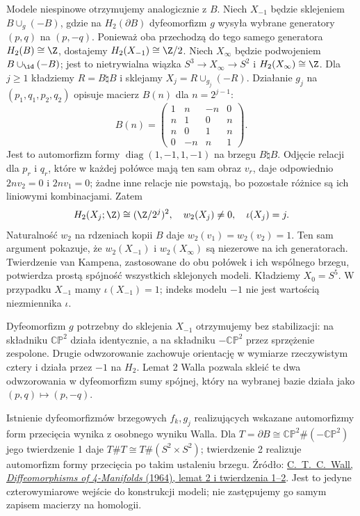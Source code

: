 Modele niespinowe otrzymujemy
analogicznie z $B$.
Niech $X_{-1}$ będzie sklejeniem
$B\cup_g(-B)$, gdzie na
$H_2(\partial B)$ dyfeomorfizm $g$
wysyła wybrane generatory $(p,q)$
na $(p,-q)$. Ponieważ oba przechodzą
do tego samego generatora
$H_2(B)\cong\Z$, dostajemy
$H_2(X_{-1})\cong\Z/2$.
Niech $X_\infty$ będzie podwojeniem
$B\cup_{\id}(-B)$;
jest to nietrywialna wiązka
$S^3\to X_\infty\to S^2$ i
$H_2(X_\infty)\cong\Z$.
Dla $j\geq1$ kładziemy $R=B\natural B$
i sklejamy $X_j=R\cup_{g_j}(-R)$.
Działanie $g_j$ na
$(p_1,q_1,p_2,q_2)$ opisuje
macierz $B(n)$ dla $n=2^{j-1}$:
\[
 B(n)=\begin{pmatrix}
 1&n&-n&0\\ n&1&0&n\\
 n&0&1&n\\0&-n&n&1
 \end{pmatrix}.
\]
Jest to automorfizm formy
$\operatorname{diag}(1,-1,1,-1)$
na brzegu $B\natural B$.
Odjęcie relacji dla
$p_r$ i $q_r$, które w każdej
połówce mają ten sam obraz $v_r$,
daje odpowiednio $2nv_2=0$
i $2nv_1=0$; żadne inne relacje
nie powstają, bo pozostałe różnice
są ich liniowymi kombinacjami.
Zatem
\[
 H_2(X_j;\Z)\cong(\Z/2^j)^2,
 \quad w_2(X_j)\ne0,\quad
 \iota(X_j)=j.
\]
Naturalność $w_2$ na rdzeniach
kopii $B$ daje $w_2(v_1)=w_2(v_2)=1$.
Ten sam argument pokazuje, że
$w_2(X_{-1})$ i $w_2(X_\infty)$
są niezerowe na ich generatorach.
Twierdzenie van Kampena, zastosowane
do obu połówek i ich wspólnego brzegu,
potwierdza prostą spójność wszystkich
sklejonych modeli.
Kładziemy $X_0=S^5$.
W przypadku $X_{-1}$ mamy
$\iota(X_{-1})=1$;
indeks modelu $-1$ nie jest
wartością niezmiennika $\iota$.

Dyfeomorfizm $g$ potrzebny do sklejenia
$X_{-1}$ otrzymujemy bez stabilizacji:
na składniku $\mathbb{CP}^2$ działa
identycznie, a na składniku
$-\mathbb{CP}^2$ przez sprzężenie zespolone.
Drugie odwzorowanie zachowuje orientację
w wymiarze rzeczywistym cztery i działa
przez $-1$ na $H_2$. Lemat 2 Walla
pozwala skleić te dwa odwzorowania
w dyfeomorfizm sumy spójnej, który
na wybranej bazie działa jako $(p,q)\mapsto(p,-q)$.

Istnienie dyfeomorfizmów brzegowych
$f_k,g_j$ realizujących wskazane
automorfizmy form przecięcia wynika
z osobnego wyniku Walla. Dla
$T=\partial B\cong\mathbb{CP}^2\#(-\mathbb{CP}^2)$
jego twierdzenie 1 daje
$T\#T\cong T\#(S^2\times S^2)$;
twierdzenie 2 realizuje automorfizm
formy przecięcia po takim ustaleniu
brzegu. Źródło:
\href{https://webhomes.maths.ed.ac.uk/~v1ranick/papers/wdiff4.pdf}
{C.\ T.\ C.\ Wall, \emph{Diffeomorphisms
of 4-Manifolds} (1964), lemat 2
i twierdzenia 1--2}.
Jest to jedyne czterowymiarowe
wejście do konstrukcji modeli;
nie zastępujemy go samym zapisem
macierzy na homologii.

